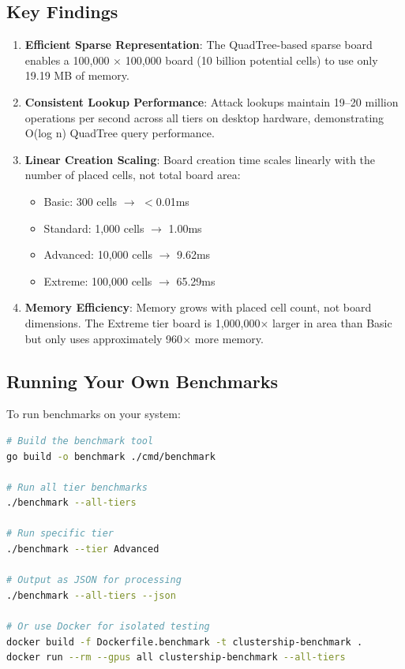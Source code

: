 \documentclass[11pt]{article}
\begin{document}
\subsection{Key Findings}

\begin{enumerate}
    \item \textbf{Efficient Sparse Representation}: The QuadTree-based sparse board enables a 100,000 $\times$ 100,000 board (10 billion potential cells) to use only 19.19 MB of memory.

    \item \textbf{Consistent Lookup Performance}: Attack lookups maintain 19--20 million operations per second across all tiers on desktop hardware, demonstrating O(log n) QuadTree query performance.

    \item \textbf{Linear Creation Scaling}: Board creation time scales linearly with the number of placed cells, not total board area:
    \begin{itemize}
        \item Basic: 300 cells $\rightarrow$ $<$0.01ms
        \item Standard: 1,000 cells $\rightarrow$ 1.00ms
        \item Advanced: 10,000 cells $\rightarrow$ 9.62ms
        \item Extreme: 100,000 cells $\rightarrow$ 65.29ms
    \end{itemize}

    \item \textbf{Memory Efficiency}: Memory grows with placed cell count, not board dimensions. The Extreme tier board is 1,000,000$\times$ larger in area than Basic but only uses approximately 960$\times$ more memory.
\end{enumerate}

\subsection{Running Your Own Benchmarks}

To run benchmarks on your system:

\begin{lstlisting}[language=bash,numbers=none]
# Build the benchmark tool
go build -o benchmark ./cmd/benchmark

# Run all tier benchmarks
./benchmark --all-tiers

# Run specific tier
./benchmark --tier Advanced

# Output as JSON for processing
./benchmark --all-tiers --json

# Or use Docker for isolated testing
docker build -f Dockerfile.benchmark -t clustership-benchmark .
docker run --rm --gpus all clustership-benchmark --all-tiers
\end{lstlisting}
\end{document}
